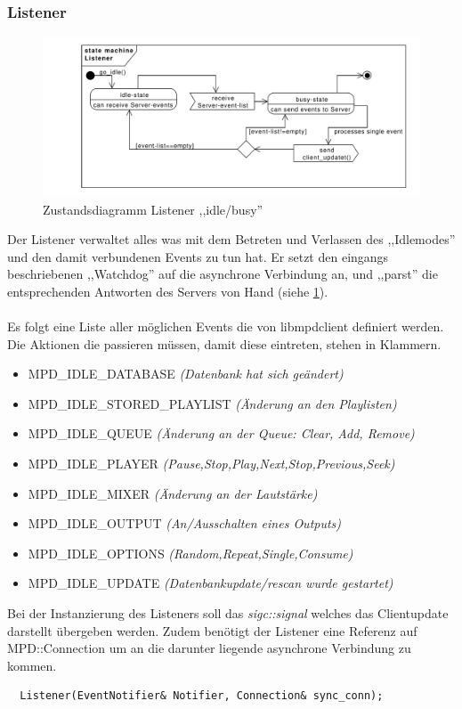 \newpage
\subsubsection{Listener}
\begin{figure}[htb!]
	\centering
        \includegraphics[width=\textwidth]{st_ListenerIdleBusy.pdf}
	\caption{Zustandsdiagramm Listener ,,idle/busy''}
	\label{st_listener}
\end{figure}

Der Listener verwaltet alles was mit dem Betreten und Verlassen des ,,Idlemodes'' und den damit verbundenen Events
zu tun hat. Er setzt den eingangs beschriebenen ,,Watchdog'' auf die asynchrone Verbindung an,
und ,,parst'' die entsprechenden Antworten des Servers von Hand (siehe \ref{st_listener}). 
\\
\\
Es folgt eine Liste aller möglichen Events die von libmpdclient definiert werden.
Die Aktionen die passieren müssen, damit diese eintreten, stehen in Klammern.
\begin{itemize}
    \item \small MPD\_IDLE\_DATABASE \it(Datenbank hat sich geändert)\rm
    \item \small MPD\_IDLE\_STORED\_PLAYLIST \it(Änderung an den Playlisten)\rm
    \item \small MPD\_IDLE\_QUEUE \it(Änderung an der Queue: Clear, Add, Remove)\rm
    \item \small MPD\_IDLE\_PLAYER \it(Pause,Stop,Play,Next,Stop,Previous,Seek)\rm
    \item \small MPD\_IDLE\_MIXER \it(Änderung an der Lautstärke)\rm
    \item \small MPD\_IDLE\_OUTPUT \it(An/Ausschalten eines Outputs)\rm
    \item \small MPD\_IDLE\_OPTIONS \it(Random,Repeat,Single,Consume)\rm
    \item \small MPD\_IDLE\_UPDATE \it(Datenbankupdate/rescan wurde gestartet)\rm
\end{itemize}
\normalsize
Bei der Instanzierung des Listeners soll das \textit{sigc::signal} welches das Clientupdate darstellt übergeben werden.
Zudem benötigt der Listener eine Referenz auf MPD::Connection um an die darunter liegende asynchrone Verbindung zu kommen.  
\begin{verbatim}
  Listener(EventNotifier& Notifier, Connection& sync_conn);
\end{verbatim}

